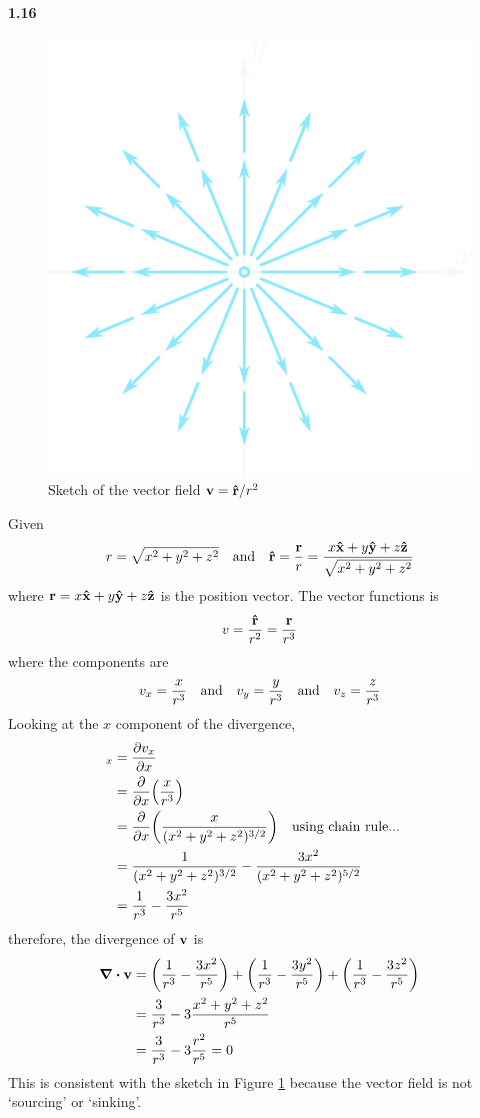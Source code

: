 \documentclass[../main.tex]{subfiles}
\begin{document}
\paragraph{1.16}
\begin{figure}[ht]
    \centering
    \includegraphics[width=0.4\linewidth]{images/fig1_16.png}
    \caption{Sketch of the vector field $\vb{v} = \vu{r} / r^2$}
    \label{fig:1.16}
\end{figure}
Given
\begin{align*}
    r = \sqrt{x^2 + y^2 + z^2} \qand
    \vu{r} = \frac{\vb{r}}{r} = \frac{x\vu{x} + y\vu{y} + z\vu{z}}{\sqrt{x^2 + y^2 + z^2}}
\end{align*}
where $\vb{r} = x\vu{x} + y\vu{y} + z\vu{z}$ is the position vector. The vector functions is
\begin{align*}
    v = \frac{\vu{r}}{r^2} = \frac{\vb{r}}{r^3}
\end{align*}
where the components are
\begin{align*}
    v_x = \frac{x}{r^3} \qand v_y = \frac{y}{r^3} \qand v_z = \frac{z}{r^3}
\end{align*}
Looking at the $x$ component of the divergence,
\begin{align*}
    [\div{\vb{v}}]_x &= \pdv{v_x}{x} \\
    &= \pdv{x}(\frac{x}{r^3}) \\
    &= \pdv{x}(\frac{x}{(x^2 + y^2 + z^2)^{3/2}}) \qq{using chain rule...}\\
    &= \frac{1}{(x^2 + y^2 + z^2)^{3/2}} - \frac{3x^2}{(x^2 + y^2 + z^2)^{5/2}} \\
    &= \frac{1}{r^3} - \frac{3x^2}{r^5}
\end{align*}
therefore, the divergence of $\vb{v}$ is
\begin{align*}
    \div{\vb{v}} &= \quantity(\frac{1}{r^3} - \frac{3x^2}{r^5})
        + \quantity(\frac{1}{r^3} - \frac{3y^2}{r^5})
        + \quantity(\frac{1}{r^3} - \frac{3z^2}{r^5}) \\
    &= \frac{3}{r^3} - 3\frac{x^2 + y^2 + z^2}{r^5} \\
    &= \frac{3}{r^3} - 3\frac{r^2}{r^5} = 0
\end{align*}
This is consistent with the sketch in Figure \ref{fig:1.16} because the vector field is not `sourcing' or
`sinking'.
\end{document}
